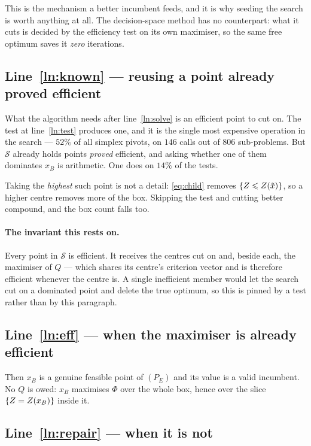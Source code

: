 \documentclass[11pt,a4paper]{article}
\begin{document}
This is the mechanism a better incumbent feeds, and it is why seeding the
search is worth anything at all.  The decision-space method has no counterpart:
what it cuts is decided by the efficiency test on its own maximiser, so the
same free optimum saves it \emph{zero} iterations.

\subsection{Line~\ref{ln:known} --- reusing a point already proved efficient}

What the algorithm needs after line~\ref{ln:solve} is an efficient point to cut
on.  The test at line~\ref{ln:test} produces one, and it is the single most
expensive operation in the search --- $52\%$ of all simplex pivots, on $146$
calls out of $806$ sub-problems.  But $\mathcal{S}$ already holds points
\emph{proved} efficient, and asking whether one of them dominates $x_B$ is
arithmetic.  One does on $14\%$ of the tests.

Taking the \emph{highest} such point is not a detail: \eqref{eq:child} removes
$\{Z \leqslant Z(\tilde{x})\}$, so a higher centre removes more of the box.
Skipping the test and cutting better compound, and the box count falls too.

\paragraph{The invariant this rests on.}  Every point in $\mathcal{S}$ is
efficient.  It receives the centres cut on and, beside each, the maximiser of
$Q$ --- which shares its centre's criterion vector and is therefore efficient
whenever the centre is.  A single inefficient member would let the search cut
on a dominated point and delete the true optimum, so this is pinned by a test
rather than by this paragraph.

\subsection{Line~\ref{ln:eff} --- when the maximiser is already efficient}

Then $x_B$ is a genuine feasible point of $(P_E)$ and its value is a valid
incumbent.  No $Q$ is owed: $x_B$ maximises $\Phi$ over the whole box, hence
over the slice $\{Z = Z(x_B)\}$ inside it.

\subsection{Line~\ref{ln:repair} --- when it is not}
\end{document}
